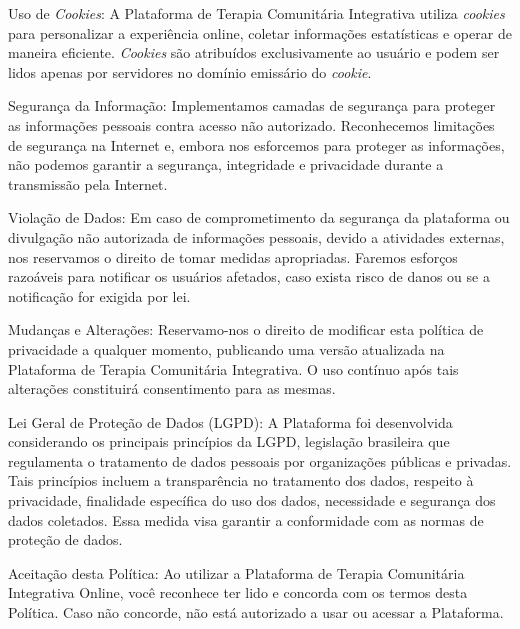 \begin{apendicesenv}
        Uso de \textit{Cookies}:
        A Plataforma de Terapia Comunitária Integrativa utiliza \textit{cookies} para personalizar a experiência online, coletar informações estatísticas e operar de maneira eficiente. \textit{Cookies} são atribuídos exclusivamente ao usuário e podem ser lidos apenas por servidores no domínio emissário do \textit{cookie}.
        
        Segurança da Informação:
        Implementamos camadas de segurança para proteger as informações pessoais contra acesso não autorizado. Reconhecemos limitações de segurança na Internet e, embora nos esforcemos para proteger as informações, não podemos garantir a segurança, integridade e privacidade durante a transmissão pela Internet.
        
        Violação de Dados:
        Em caso de comprometimento da segurança da plataforma ou divulgação não autorizada de informações pessoais, devido a atividades externas, nos reservamos o direito de tomar medidas apropriadas. Faremos esforços razoáveis para notificar os usuários afetados, caso exista risco de danos ou se a notificação for exigida por lei.
        
        Mudanças e Alterações:
        Reservamo-nos o direito de modificar esta política de privacidade a qualquer momento, publicando uma versão atualizada na Plataforma de Terapia Comunitária Integrativa. O uso contínuo após tais alterações constituirá consentimento para as mesmas.
        
        Lei Geral de Proteção de Dados (LGPD):
        A Plataforma foi desenvolvida considerando os principais princípios da LGPD, legislação brasileira que regulamenta o tratamento de dados pessoais por organizações públicas e privadas. Tais princípios incluem a transparência no tratamento dos dados, respeito à privacidade, finalidade específica do uso dos dados, necessidade e segurança dos dados coletados. Essa medida visa garantir a conformidade com as normas de proteção de dados.
        
        Aceitação desta Política:
        Ao utilizar a Plataforma de Terapia Comunitária Integrativa Online, você reconhece ter lido e concorda com os termos desta Política. Caso não concorde, não está autorizado a usar ou acessar a Plataforma.
    

\end{apendicesenv}
